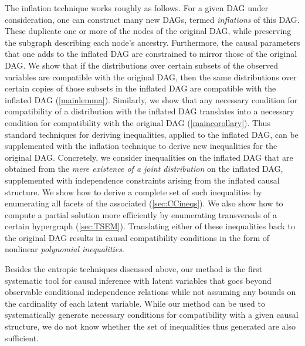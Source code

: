\documentclass[aps,english,superscriptaddress,onecolumn,twoside,longbibliography,pra,floatfix,fleqn,nofootinbib]{revtex4-1}%
\newcommand*{\tblue}[1]{{\color{MidnightBlue}{\textbf{#1}}}}
\theoremstyle{definition}
\begin{document}
The inflation technique works roughly as follows. For a given DAG under consideration, one can construct many new DAGs, termed {\em inflations} of this DAG. These duplicate one or more of the nodes of the original DAG, while preserving the subgraph describing each node's ancestry.
Furthermore, the causal parameters that one adds to the inflated DAG are constrained to mirror those of the original DAG.  We show that if the distributions over certain subsets of the observed variables are compatible with the original DAG, then the same distributions over certain copies of those subsets in the inflated DAG are compatible with the inflated DAG (\cref{mainlemma}).  Similarly, we show that any necessary condition for compatibility of a distribution with the inflated DAG translates into a necessary condition for compatibility with the original DAG (\cref{maincorollary}).  Thus standard techniques for deriving inequalities, applied to the inflated DAG,  can be supplemented with the inflation technique to derive new inequalities for the original DAG.  Concretely, we consider inequalities on the inflated DAG that are obtained from the \emph{mere existence of a joint distribution} on the inflated DAG, supplemented with independence constraints arising from the inflated causal structure.   We show how to derive a complete set of such inequalities by enumerating all facets of the associated \tblue{marginal polytope} (\cref{sec:CCineqs}). We also show how to compute a partial solution more efficiently by enumerating transversals of a certain hypergraph (\cref{sec:TSEM}). Translating either of these inequalities back to the original DAG results in causal compatibility conditions in the form of nonlinear \emph{polynomial inequalities}.

Besides the entropic techniques discussed above, our method is the first systematic tool for causal inference with latent variables that goes beyond observable conditional independence relations while not assuming any bounds on the cardinality of each latent variable. While our method can be used to systematically generate necessary conditions for compatibility with a given causal structure, we do not know whether the set of inequalities thus generated are also sufficient.  
\end{document}
